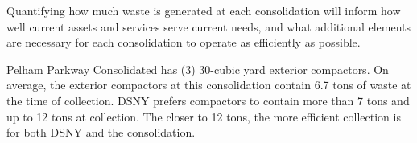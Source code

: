 
    Quantifying how much waste is generated at each consolidation will inform how well current assets and services serve current needs, and what additional elements are necessary for each consolidation to operate as efficiently as possible.
    
    Pelham Parkway Consolidated has (3) 30-cubic yard exterior compactors. On average, the exterior compactors at this consolidation contain 6.7 tons of waste at the time of collection. DSNY prefers compactors to contain more than 7 tons and up to 12 tons at collection. The closer to 12 tons, the more efficient collection is for both DSNY and the consolidation.